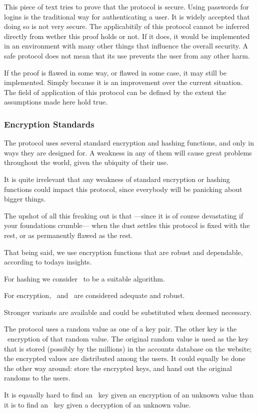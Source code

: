 This piece of text tries to prove that the \TIMO protocol is secure.
Using passwords for logins is the traditional way for authenticating a user.
It is widely accepted that doing so is not very secure.
The applicabitily of this protocol cannot be inferred directly from wether this proof holds or not.
If it does,
it would be implemented in an environment with many other things that influence the overall security.
A safe protocol does not mean that its use prevents the user from any other harm.
\par
If the proof is flawed in some way,
or flawed in some case,
it may still be implemented.
Simply because it is an improvement over the current situation.
The field of application of this protocol can be defined by the extent the assumptions made here hold true.
\subsubsection{Encryption Standards}
The \TIMO protocol uses several standard encryption and hashing functions,
and only in ways they are designed for.
A weakness in any of them will cause great problems throughout the world,
given the ubiquity of their use.
\begin{moafu}
It is quite irrelevant that any weakness of standard encryption or hashing functions could impact this protocol,
since everybody will be panicking about bigger things.
\end{moafu}
The upshot of all this freaking out is that%
---since it is of course devastating if your foundations crumble---%
when the dust settles this protocol is fixed with the rest,
or as permanently flawed as the rest.
\par
That being said, we use encryption functions that are robust and dependable, according to todays insights.
\begin{axiom}
For hashing we consider \SHA\ to be a suitable algorithm.
\end{axiom}
\begin{axiom}
For encryption, \AES\ and \RSA\ are considered adequate and robust.
\end{axiom}
Stronger variants are available and could be substituted when deemed necessary.
\par\vspace{4mm}
The protocol uses a random value as one of a key pair.
The other key is the \AES\ encryption of that random value.
The original random value is used as the key that is stored
(possibly by the millions)
in the accounts database on the website; the encrypted values are distributed among the users.
It could equally be done the other way around:
store the encrypted keys, and hand out the original randoms to the users.
\begin{moafu}
It is eqaually hard to find an \AES\ key given an encryption of an unknown value than it is to find an \AES\ key given a decryption of an unknown value.
\end{moafu}
